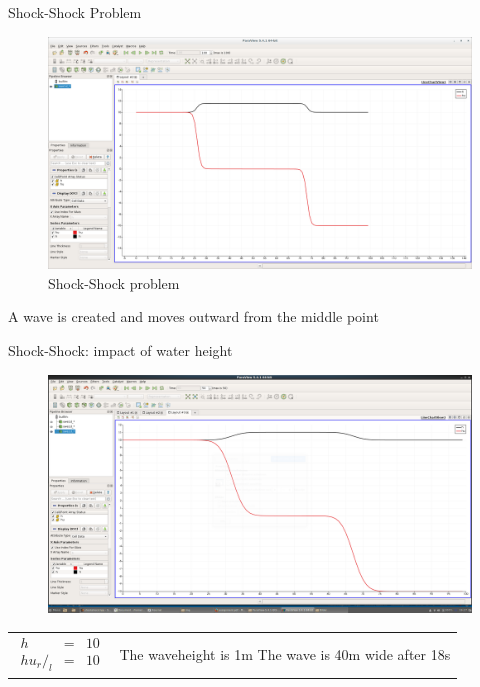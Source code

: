\documentclass[shortpres]{beamer}
\newcommand{\imgvoffset}{-20pt}
\newcommand{\imgfullscale}{0.75}
\begin{document}
\begin{frame}{Shock-Shock Problem}
	\begin{figure}[t]
		\vspace{\imgvoffset}
		\includegraphics[clip, width=\imgfullscale\linewidth]{img/Shock-Shock.png}
		\caption*{Shock-Shock problem}
	\end{figure}
	A wave is created and moves outward from the middle point
\end{frame}


\begin{frame}{Shock-Shock: impact of water height}
	\begin{figure}[t]
		\vspace{\imgvoffset}
		\includegraphics[width=\imgfullscale\linewidth]{img/Shock_h10_t18.png}
		\caption*{}
	\end{figure}
	
	\begin{tabular}{m{3cm} m{\linewidth-5cm}}
		$
		\begin{matrix}
		h & = & 10\\
		hu_r/_l & = & 10
		\end{matrix}
		$
		&
		
		The \Delta waveheight is 1m \newline
		The wave is 40m wide after 18s
	\end{tabular}
\end{frame}
\end{document}
